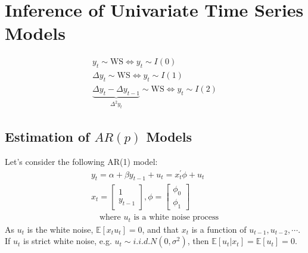 \section{Inference of Univariate Time Series Models}
\label{sec:inference-univariate-time-series-models}

\begin{gather*}
    y_t \sim \text{WS} \Leftrightarrow y_t \sim I(0) \\
    \Delta y_t \sim \text{WS} \Leftrightarrow y_t \sim I(1) \\
    \underset{\Delta^2 y_t}{\underbrace{\Delta y_t - \Delta y_{t-1}}} \sim \text{WS} \Leftrightarrow y_t \sim I(2)
\end{gather*}

\subsection{Estimation of $AR(p)$ Models}

Let's consider the following AR(1) model:
\begin{gather*}
    y_t = \alpha + \beta y_{t-1} + u_t = x_t^{\prime} \phi + u_t\\
    x_t = \begin{bmatrix} 1 \\ y_{t-1} \end{bmatrix}, \phi = \begin{bmatrix} \phi_0 \\ \phi_1 \end{bmatrix} \\
    \quad \text{where } u_t \text{ is a white noise process}
\end{gather*}
As $u_t$ is the white noise, $\mathbb{E}[x_t u_t] = 0$, and that $x_t$ is a function of $u_{t-1}, u_{t-2}, \cdots$.
If $u_t$ is strict white noise, e.g. $u_t \sim i.i.d. N(0, \sigma^2)$, then $\mathbb{E}[u_t | x_t] = \mathbb{E}[u_t] = 0$.

